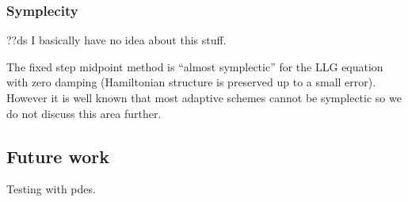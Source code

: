 \subsubsection{Symplecity}

??ds I basically have no idea about this stuff.

The fixed step midpoint method is ``almost symplectic'' for the LLG equation with zero damping (Hamiltonian structure is preserved up to a small error).\cite{Austin1993}
However it is well known that most adaptive schemes cannot be symplectic\cite{Iserles2009} %
so we do not discuss this area further.


\subsection{Future work}


Testing with pdes.



